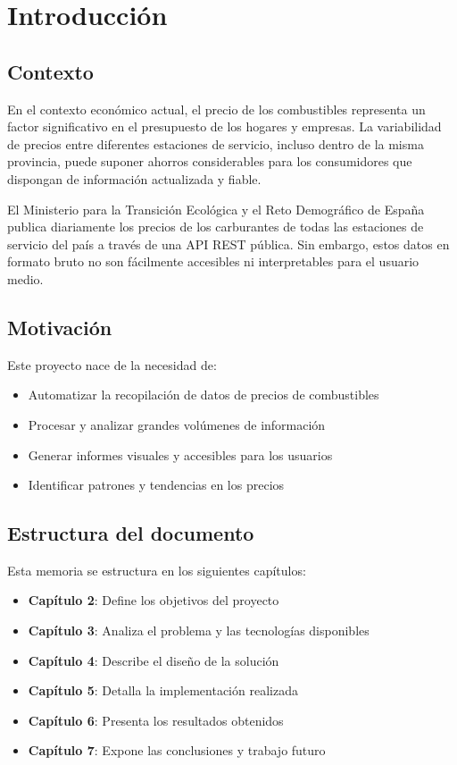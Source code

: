 \chapter{Introducción}

\section{Contexto}

En el contexto económico actual, el precio de los combustibles representa un factor significativo en el presupuesto de los hogares y empresas. La variabilidad de precios entre diferentes estaciones de servicio, incluso dentro de la misma provincia, puede suponer ahorros considerables para los consumidores que dispongan de información actualizada y fiable.

El Ministerio para la Transición Ecológica y el Reto Demográfico de España publica diariamente los precios de los carburantes de todas las estaciones de servicio del país a través de una API REST pública. Sin embargo, estos datos en formato bruto no son fácilmente accesibles ni interpretables para el usuario medio.

\section{Motivación}

Este proyecto nace de la necesidad de:

\begin{itemize}
  \item Automatizar la recopilación de datos de precios de combustibles
  \item Procesar y analizar grandes volúmenes de información
  \item Generar informes visuales y accesibles para los usuarios
  \item Identificar patrones y tendencias en los precios
\end{itemize}

\section{Estructura del documento}

Esta memoria se estructura en los siguientes capítulos:

\begin{itemize}
  \item \textbf{Capítulo 2}: Define los objetivos del proyecto
  \item \textbf{Capítulo 3}: Analiza el problema y las tecnologías disponibles
  \item \textbf{Capítulo 4}: Describe el diseño de la solución
  \item \textbf{Capítulo 5}: Detalla la implementación realizada
  \item \textbf{Capítulo 6}: Presenta los resultados obtenidos
  \item \textbf{Capítulo 7}: Expone las conclusiones y trabajo futuro
\end{itemize}
